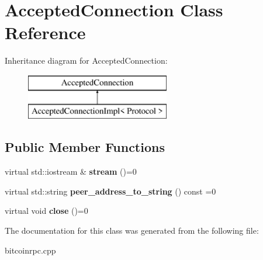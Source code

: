 \hypertarget{class_accepted_connection}{}\section{Accepted\+Connection Class Reference}
\label{class_accepted_connection}
Inheritance diagram for Accepted\+Connection\+:\begin{figure}[H]
\begin{center}
\leavevmode
\includegraphics[height=2.000000cm]{class_accepted_connection}
\end{center}
\end{figure}
\subsection*{Public Member Functions}
\begin{DoxyCompactItemize}
\item 
\mbox{\label{class_accepted_connection_a2072a12e4d8f1b79a67bc86903400a0e}} 
virtual std\+::iostream \& {\bfseries stream} ()=0
\item 
\mbox{\label{class_accepted_connection_adb2d35d48527a90078833f85249f2a56}} 
virtual std\+::string {\bfseries peer\+\_\+address\+\_\+to\+\_\+string} () const =0
\item 
\mbox{\label{class_accepted_connection_a819d5373c0d62e736fd6e0027daa2893}} 
virtual void {\bfseries close} ()=0
\end{DoxyCompactItemize}


The documentation for this class was generated from the following file\+:\begin{DoxyCompactItemize}
\item 
bitcoinrpc.\+cpp\end{DoxyCompactItemize}

